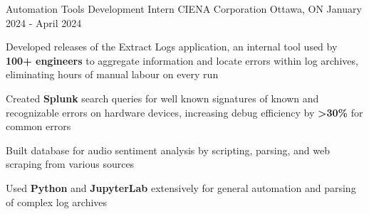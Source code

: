 

\begin{cventries}




	\cventry
	{Automation Tools Development Intern} %
	{CIENA Corporation} %
	{Ottawa, ON} %
	{January 2024 - April 2024} %
	{
		\begin{cvitems} %
			\item {Developed releases of the Extract Logs application, an internal tool used by \textbf{100+ engineers} to aggregate information and locate errors within log archives, eliminating hours of manual labour on every run}
			\item {Created \textbf{Splunk} search queries for well known signatures of known and recognizable errors on hardware devices, increasing debug efficiency by \textbf{>30\%} for common errors}
			\item {Built database for audio sentiment analysis by scripting, parsing, and web scraping from various sources}
			\item {Used \textbf{Python} and \textbf{JupyterLab} extensively for general automation and parsing of complex log archives}
		\end{cvitems}
	}


\end{cventries}
